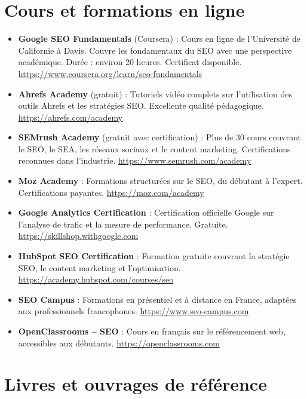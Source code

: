 \documentclass[12pt,a4paper,twoside]{report}
\begin{document}
\section*{Cours et formations en ligne}

\begin{itemize}
    \item \textbf{Google SEO Fundamentals} (Coursera) : Cours en ligne de l'Université de Californie à Davis. Couvre les fondamentaux du SEO avec une perspective académique. Durée : environ 20 heures. Certificat disponible. \url{https://www.coursera.org/learn/seo-fundamentals}
    \item \textbf{Ahrefs Academy} (gratuit) : Tutoriels vidéo complets sur l'utilisation des outils Ahrefs et les stratégies SEO. Excellente qualité pédagogique. \url{https://ahrefs.com/academy}
    \item \textbf{SEMrush Academy} (gratuit avec certification) : Plus de 30 cours couvrant le SEO, le SEA, les réseaux sociaux et le content marketing. Certifications reconnues dans l'industrie. \url{https://www.semrush.com/academy}
    \item \textbf{Moz Academy} : Formations structurées sur le SEO, du débutant à l'expert. Certifications payantes. \url{https://moz.com/academy}
    \item \textbf{Google Analytics Certification} : Certification officielle Google sur l'analyse de trafic et la mesure de performance. Gratuite. \url{https://skillshop.withgoogle.com}
    \item \textbf{HubSpot SEO Certification} : Formation gratuite couvrant la stratégie SEO, le content marketing et l'optimisation. \url{https://academy.hubspot.com/courses/seo}
    \item \textbf{SEO Campus} : Formations en présentiel et à distance en France, adaptées aux professionnels francophones. \url{https://www.seo-campus.com}
    \item \textbf{OpenClassrooms -- SEO} : Cours en français sur le référencement web, accessibles aux débutants. \url{https://openclassrooms.com}
\end{itemize}

\section*{Livres et ouvrages de référence}
\end{document}
